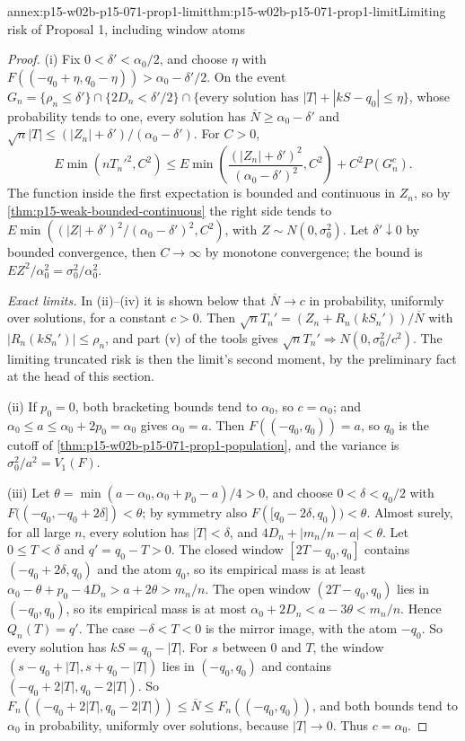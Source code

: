 \begin{annexitem}{annex:p15-w02b-p15-071-prop1-limit}{thm:p15-w02b-p15-071-prop1-limit}{Limiting risk of Proposal 1, including window atoms}
\begin{proof}
(i) Fix \(0<\delta'<\alpha_0/2\), and choose \(\eta\) with
\(F((-q_0+\eta,q_0-\eta))>\alpha_0-\delta'/2\). On the event
\(G_n=\{\rho_n\leq\delta'\}\cap\{2D_n<\delta'/2\}\cap
\{\text{every solution has }|T|+|kS-q_0|\leq\eta\}\), whose probability
tends to one, every solution has \(\overline N\geq\alpha_0-\delta'\)
and \(\sqrt n|T|\leq(|Z_n|+\delta')/(\alpha_0-\delta')\). For \(C>0\),
\[
 E\min(nT_n'^2,C^2)\leq
 E\min\!\left(\frac{(|Z_n|+\delta')^2}{(\alpha_0-\delta')^2},C^2\right)
 +C^2P(G_n^c).
\]
The function inside the first expectation is bounded and continuous in
\(Z_n\), so by \cref{thm:p15-weak-bounded-continuous} the right side
tends to \(E\min((|Z|+\delta')^2/(\alpha_0-\delta')^2,C^2)\), with
\(Z\sim N(0,\sigma_0^2)\). Let \(\delta'\downarrow0\) by bounded
convergence, then \(C\to\infty\) by monotone convergence; the bound is
\(EZ^2/\alpha_0^2=\sigma_0^2/\alpha_0^2\).

\emph{Exact limits.} In (ii)--(iv) it is shown below that
\(\overline N\to c\) in probability, uniformly over solutions, for a
constant \(c>0\). Then \(\sqrt nT_n'=(Z_n+R_n(kS_n'))/\overline N\) with
\(|R_n(kS_n')|\leq\rho_n\), and part (v) of the tools gives
\(\sqrt nT_n'\Rightarrow N(0,\sigma_0^2/c^2)\). The limiting truncated
risk is then the limit's second moment, by the preliminary fact at the
head of this section.

(ii) If \(p_0=0\), both bracketing bounds tend to \(\alpha_0\), so
\(c=\alpha_0\); and \(\alpha_0\leq a\leq\alpha_0+2p_0=\alpha_0\) gives
\(\alpha_0=a\). Then \(F((-q_0,q_0))=a\), so \(q_0\) is the cutoff of
\cref{thm:p15-w02b-p15-071-prop1-population}, and the variance is
\(\sigma_0^2/a^2=V_1(F)\).

(iii) Let \(\theta=\min(a-\alpha_0,\alpha_0+p_0-a)/4>0\), and choose
\(0<\delta<q_0/2\) with \(F((-q_0,-q_0+2\delta])<\theta\); by symmetry
also \(F([q_0-2\delta,q_0))<\theta\). Almost surely, for all large
\(n\), every solution has \(|T|<\delta\), and
\(4D_n+|m_n/n-a|<\theta\). Let \(0\leq T<\delta\) and
\(q'=q_0-T>0\). The closed window \([2T-q_0,q_0]\) contains
\((-q_0+2\delta,q_0)\) and the atom \(q_0\), so its empirical mass is at
least \(\alpha_0-\theta+p_0-4D_n>a+2\theta>m_n/n\). The open window
\((2T-q_0,q_0)\) lies in \((-q_0,q_0)\), so its empirical mass is at
most \(\alpha_0+2D_n<a-3\theta<m_n/n\). Hence \(Q_n(T)=q'\). The case
\(-\delta<T<0\) is the mirror image, with the atom \(-q_0\). So every
solution has \(kS=q_0-|T|\). For \(s\) between \(0\) and \(T\), the
window \((s-q_0+|T|,s+q_0-|T|)\) lies in \((-q_0,q_0)\) and contains
\((-q_0+2|T|,q_0-2|T|)\). So
\(F_n((-q_0+2|T|,q_0-2|T|))\leq\overline N\leq F_n((-q_0,q_0))\), and
both bounds tend to \(\alpha_0\) in probability, uniformly over
solutions, because \(|T|\to0\). Thus \(c=\alpha_0\).


\end{proof}
\end{annexitem}
